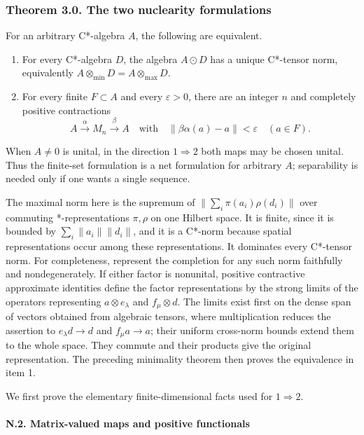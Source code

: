 \documentclass[
  11pt,
]{article}
\providecommand{\tightlist}{%
  \setlength{\itemsep}{0pt}\setlength{\parskip}{0pt}}
\begin{document}
\subsubsection{Theorem 3.0. The two nuclearity
formulations}\label{theorem-3.0.-the-two-nuclearity-formulations}

For an arbitrary C*-algebra \(A\), the following are equivalent.

\begin{enumerate}
\def\labelenumi{\arabic{enumi}.}
\tightlist
\item
  For every C*-algebra \(D\), the algebra \(A\odot D\) has a unique
  C*-tensor norm, equivalently \(A\otimes_{\min}D=A\otimes_{\max}D\).
\item
  For every finite \(F\subset A\) and every \(\varepsilon>0\), there are
  an integer \(n\) and completely positive contractions \[
  A\xrightarrow{\alpha}M_n\xrightarrow{\beta}A
  \quad\text{with}\quad
  \|\beta\alpha(a)-a\|<\varepsilon\quad(a\in F).
  \tag{N.1}
  \]
\end{enumerate}

When \(A\ne0\) is unital, in the direction \(1\Rightarrow2\) both maps
may be chosen unital. Thus the finite-set formulation is a net
formulation for arbitrary \(A\); separability is needed only if one
wants a single sequence.

The maximal norm here is the supremum of \(\|\sum_i\pi(a_i)\rho(d_i)\|\)
over commuting *-representations \(\pi,\rho\) on one Hilbert space. It
is finite, since it is bounded by \(\sum_i\|a_i\|\|d_i\|\), and it is a
C*-norm because spatial representations occur among these
representations. It dominates every C*-tensor norm. For completeness,
represent the completion for any such norm faithfully and
nondegenerately. If either factor is nonunital, positive contractive
approximate identities define the factor representations by the strong
limits of the operators representing \(a\otimes e_\lambda\) and
\(f_\mu\otimes d\). The limits exist first on the dense span of vectors
obtained from algebraic tensors, where multiplication reduces the
assertion to \(e_\lambda d\to d\) and \(f_\mu a\to a\); their uniform
cross-norm bounds extend them to the whole space. They commute and their
products give the original representation. The preceding minimality
theorem then proves the equivalence in item 1.

We first prove the elementary finite-dimensional facts used for
\(1\Rightarrow2\).

\paragraph{N.2. Matrix-valued maps and positive
functionals}\label{n.2.-matrix-valued-maps-and-positive-functionals}
\end{document}
